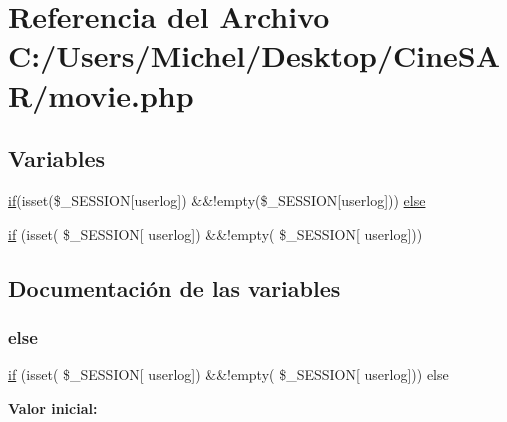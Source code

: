 \hypertarget{movie_8php}{}\section{Referencia del Archivo C\+:/\+Users/\+Michel/\+Desktop/\+Cine\+S\+A\+R/movie.php}
\label{movie_8php}
\subsection*{Variables}
\begin{DoxyCompactItemize}
\item 
\mbox{\hyperlink{register_8php_aefb5893336d7ead40ae915367f4b82cc}{if}}(isset(\$\+\_\+\+S\+E\+S\+S\+I\+ON\mbox{[}\textquotesingle{}userlog\textquotesingle{}\mbox{]}) \&\&!empty(\$\+\_\+\+S\+E\+S\+S\+I\+ON\mbox{[}\textquotesingle{}userlog\textquotesingle{}\mbox{]})) \mbox{\hyperlink{movie_8php_a3e85a20b0f9c4bed1d7e6bf901f6030c}{else}}
\item 
\mbox{\hyperlink{movie_8php_aefb5893336d7ead40ae915367f4b82cc}{if}} (isset( \$\+\_\+\+S\+E\+S\+S\+I\+ON\mbox{[} \textquotesingle{}userlog\textquotesingle{}\mbox{]}) \&\&!empty( \$\+\_\+\+S\+E\+S\+S\+I\+ON\mbox{[} \textquotesingle{}userlog\textquotesingle{}\mbox{]}))
\end{DoxyCompactItemize}


\subsection{Documentación de las variables}
\mbox{\label{movie_8php_a3e85a20b0f9c4bed1d7e6bf901f6030c}} 
\subsubsection{\texorpdfstring{else}{else}}
{\footnotesize\ttfamily \mbox{\hyperlink{register_8php_aefb5893336d7ead40ae915367f4b82cc}{if}} (isset( \$\+\_\+\+S\+E\+S\+S\+I\+ON\mbox{[} \textquotesingle{}userlog\textquotesingle{}\mbox{]}) \&\&!empty( \$\+\_\+\+S\+E\+S\+S\+I\+ON\mbox{[} \textquotesingle{}userlog\textquotesingle{}\mbox{]})) else}

{\bfseries Valor inicial\+:}
\begin{DoxyCode}{0}
\DoxyCodeLine{\{}

\end{DoxyCode}


